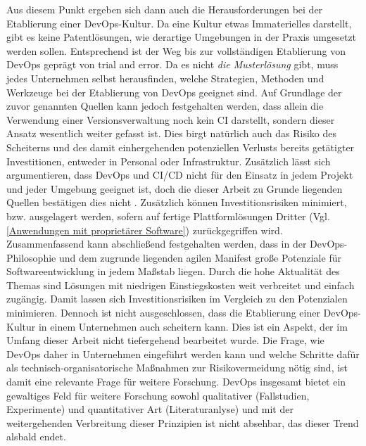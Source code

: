 Aus diesem Punkt ergeben sich dann auch die Herausforderungen bei der Etablierung einer \acrshort{DevOps}-Kultur. Da eine Kultur etwas Immaterielles darstellt, gibt es keine Patentlösungen, wie derartige Umgebungen in der Praxis umgesetzt werden sollen.
Entsprechend ist der Weg bis zur vollständigen Etablierung von \gls{DevOps} geprägt von \glqq{}trial and error\grqq{}. Da es nicht \textit{die Musterlösung} gibt, muss jedes Unternehmen selbst herausfinden, welche Strategien, Methoden und Werkzeuge bei der Etablierung von \gls{DevOps} geeignet sind. Auf Grundlage der zuvor genannten Quellen kann jedoch festgehalten werden, dass allein die Verwendung einer Versionsverwaltung noch kein \acrshort{CI} darstellt, sondern dieser Ansatz wesentlich weiter gefasst ist. Dies birgt natürlich auch das Risiko des Scheiterns und des damit einhergehenden potenziellen Verlusts bereits getätigter Investitionen, entweder in Personal oder Infrastruktur. Zusätzlich lässt sich argumentieren, dass \gls{DevOps} und \acrshort{CI}/\acrshort{CD} nicht für den Einsatz in jedem Projekt und jeder Umgebung geeignet ist, doch die dieser Arbeit zu Grunde liegenden Quellen bestätigen dies nicht \cite[Abb. 2 und 3]{hilton_usage_2016}. Zusätzlich können Investitionsrisiken minimiert, bzw. ausgelagert werden, sofern auf fertige Plattformlösungen Dritter (Vgl. \ref{Anwendungen mit proprietärer Software}) zurückgegriffen wird.\newline
Zusammenfassend kann abschließend festgehalten werden, dass in der \gls{DevOps}-Philosophie und dem zugrunde liegenden agilen Manifest \cite{beck_manifest_2001} große Potenziale für Softwareentwicklung in jedem Maßstab liegen. Durch die hohe Aktualität des Themas sind Lösungen mit niedrigen Einstiegskosten weit verbreitet und einfach zugängig. Damit lassen sich Investitionsrisiken im Vergleich zu den Potenzialen minimieren. Dennoch ist nicht ausgeschlossen, dass die Etablierung einer \acrshort{DevOps}-Kultur in einem Unternehmen auch scheitern kann. Dies ist ein Aspekt, der im Umfang dieser Arbeit nicht tiefergehend bearbeitet wurde.
Die Frage, wie \gls{DevOps} daher in Unternehmen eingeführt werden kann und welche Schritte dafür als technisch-organisatorische Maßnahmen zur Risikovermeidung nötig sind, ist damit eine relevante Frage für weitere Forschung. \gls{DevOps} insgesamt bietet ein gewaltiges Feld für weitere Forschung sowohl qualitativer (Fallstudien, Experimente) und quantitativer Art (Literaturanlyse) und mit der weitergehenden Verbreitung dieser Prinzipien ist nicht absehbar, das dieser Trend alsbald endet.